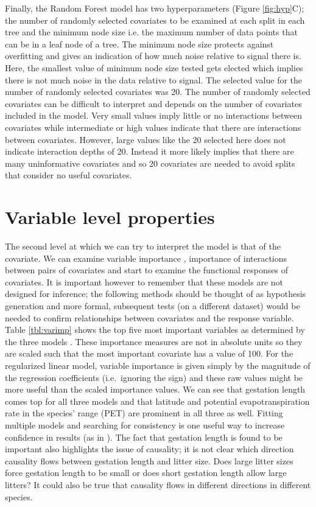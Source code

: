 \documentclass[12pt]{article}
\begin{document}
Finally, the Random Forest model has two hyperparameters (Figure \ref{fig:hyp}C); the number of randomly selected covariates to be examined at each split in each tree and the minimum node size i.e. the maximum number of data points that can be in a leaf node of a tree.
The minimum node size protects against overfitting and gives an indication of how much noise relative to signal there is.
Here, the smallest value of minimum node size tested gets elected which implies there is not much noise in the data relative to signal.
The selected value for the number of randomly selected covariates was 20.
The number of randomly selected covariates can be difficult to interpret and depends on the number of covariates included in the model.
Very small values imply little or no interactions between covariates while intermediate or high values indicate that there are interactions between covariates.
However, large values like the 20 selected here does not indicate interaction depths of 20.
Instead it more likely implies that there are many uninformative covariates and so 20 covariates are needed to avoid splits that consider no useful covariates.

\section{Variable level properties}\label{variable-level-properties}

The second level at which we can try to interpret the model is that of the covariate.
We can examine variable importance \citep{oppel2009alternative}, importance of interactions between pairs of covariates and start to examine the functional responses of covariates.
It is important however to remember that these models are not designed for inference; the following methods should be thought of as hypothesis generation and more formal, subsequent tests (on a different dataset) would be needed to confirm relationships between covariates and the response variable.
Table \ref{tbl:varimp} shows the top five most important variables as determined by the three models \citep{oppel2009alternative}.
These importance measures are not in absolute units so they are scaled such that the most important covariate has a value of 100.
For the regularized linear model, variable importance is given simply by the magnitude of the regression coefficients (i.e.~ignoring the sign) and these raw values might be more useful than the scaled importance values.
We can see that gestation length comes top for all three models and that latitude and potential evapotranspiration rate in the species' range (PET) are prominent in all three as well.
Fitting multiple models and searching for consistency is one useful way to increase confidence in results (as in \citet{appelhans2015evaluating}).
The fact that gestation length is found to be important also highlights the issue of causality; it is not clear which direction causality flows between gestation length and litter size.
Does large litter sizes force gestation length to be small or does short gestation length allow large litters? 
It could also be true that causality flows in different directions in different species.
\end{document}
